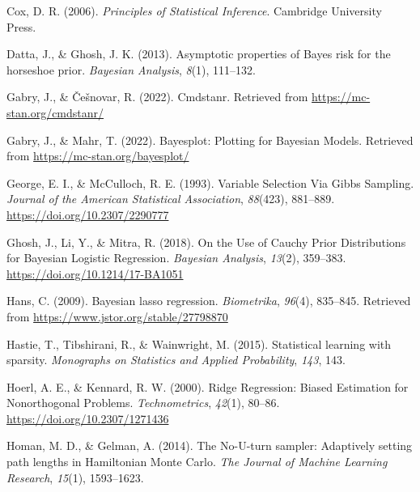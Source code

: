 \documentclass[
  man, donotrepeattitle,floatsintext]{apa6}
\newlength{\cslhangindent}
\newlength{\cslentryspacingunit} %
\newenvironment{CSLReferences}[2] %
 {%
  \setlength{\parindent}{0pt}
  \ifodd #1
  \let\oldpar\par
  \def\par{\hangindent=\cslhangindent\oldpar}
  \fi
  \setlength{\parskip}{#2\cslentryspacingunit}
 }%
 {}
\begin{document}
\begin{CSLReferences}{1}{0}
\leavevmode{}%
Cox, D. R. (2006). \emph{Principles of {Statistical} {Inference}}. Cambridge University Press.

\leavevmode{}%
Datta, J., \& Ghosh, J. K. (2013). Asymptotic properties of {Bayes} risk for the horseshoe prior. \emph{Bayesian Analysis}, \emph{8}(1), 111--132.

\leavevmode{}%
Gabry, J., \& Češnovar, R. (2022). Cmdstanr. Retrieved from \url{https://mc-stan.org/cmdstanr/}

\leavevmode{}%
Gabry, J., \& Mahr, T. (2022). Bayesplot: {Plotting} for {Bayesian} {Models}. Retrieved from \url{https://mc-stan.org/bayesplot/}

\leavevmode{}%
George, E. I., \& McCulloch, R. E. (1993). Variable {Selection} {Via} {Gibbs} {Sampling}. \emph{Journal of the American Statistical Association}, \emph{88}(423), 881--889. \url{https://doi.org/10.2307/2290777}

\leavevmode{}%
Ghosh, J., Li, Y., \& Mitra, R. (2018). On the {Use} of {Cauchy} {Prior} {Distributions} for {Bayesian} {Logistic} {Regression}. \emph{Bayesian Analysis}, \emph{13}(2), 359--383. \url{https://doi.org/10.1214/17-BA1051}

\leavevmode{}%
Hans, C. (2009). Bayesian lasso regression. \emph{Biometrika}, \emph{96}(4), 835--845. Retrieved from \url{https://www.jstor.org/stable/27798870}

\leavevmode{}%
Hastie, T., Tibshirani, R., \& Wainwright, M. (2015). Statistical learning with sparsity. \emph{Monographs on Statistics and Applied Probability}, \emph{143}, 143.

\leavevmode{}%
Hoerl, A. E., \& Kennard, R. W. (2000). Ridge {Regression}: {Biased} {Estimation} for {Nonorthogonal} {Problems}. \emph{Technometrics}, \emph{42}(1), 80--86. \url{https://doi.org/10.2307/1271436}

\leavevmode{}%
Homan, M. D., \& Gelman, A. (2014). The {No}-{U}-turn sampler: Adaptively setting path lengths in {Hamiltonian} {Monte} {Carlo}. \emph{The Journal of Machine Learning Research}, \emph{15}(1), 1593--1623.


\end{CSLReferences}
\end{document}
